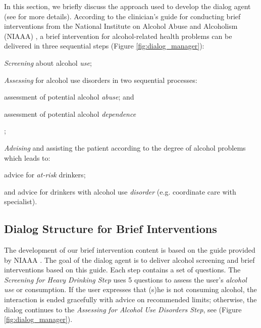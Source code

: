 \documentclass[letterpaper]{article}
\begin{document}
In this section, we briefly discuss the approach used to develop the dialog 
agent (see \cite{YASCLL14} for more details). According to the 
clinician's guide for conducting brief interventions from the National Institute on Alcohol Abuse 
and Alcoholism (NIAAA) \cite{national2007helping}, a brief intervention for alcohol-related health 
problems can be delivered in three sequential steps (Figure 
\ref{fig:dialog_manager}): 
\begin{inparaenum}[1)] 
\item {\em Screening} about alcohol {\em use}; 
\item {\em Assessing} for alcohol use disorders in two sequential processes: 
  \begin{inparaenum}[a)] 
    \item assessment of potential alcohol {\em abuse}; and 
    \item assessment  of potential alcohol {\em dependence}
  \end{inparaenum}; 
\item {\em Advising} and assisting the patient according to the degree of alcohol problems which leads to: 
  \begin{inparaenum} 
    \item advice for {\em at-risk} drinkers; 
    \item and advice for drinkers with alcohol use {\em disorder} (e.g. coordinate care with specialist).
  \end{inparaenum} 
\end{inparaenum}

\subsection*{Dialog Structure for Brief Interventions}

The development of our brief intervention content is based on the guide provided by 
NIAAA \cite{national2006niaaa}. The goal of the dialog agent is to deliver alcohol screening and 
brief interventions based on this guide. Each step contains a set of questions. The {\em Screening for Heavy Drinking  Step}
uses 5 questions to assess the user's {\em alcohol use} or consumption.  If the user 
expresses that (s)he is not consuming alcohol, the interaction is  ended gracefully with advice on recommended limits; otherwise, the dialog continues to the {\em Assessing for Alcohol Use Disorders Step}, see (Figure \ref{fig:dialog_manager}).
\end{document}
